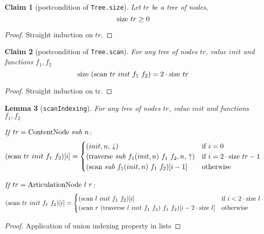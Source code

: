 \documentclass{article}
\newtheorem{lemma}{Lemma}
\newtheorem{claim}[lemma]{Claim}
\newcommand{\textfun}[1]{\textup{#1}}
\newcommand{\textcode}[1]{\texttt{#1}}
\newcommand{\fone}[2]{\ensuremath{f_{1}(#1, #2)}}
\newcommand{\contentNode}[2]{\textfun{ContentNode}\ #1\ #2}
\newcommand{\artNode}[2]{\textfun{ArticulationNode}\ #1\ #2}
\newcommand{\longtraverse}[4]{\textfun{traverse}\ #1\ #2\ #3 \ #4}
\newcommand{\longscan}[4]{\textfun{scan}\ #1\ #2\ #3 \ #4}
\newcommand{\up}{\uparrow}
\newcommand{\down}{\downarrow}
\newcommand{\size}[1]{\textfun{size}\ #1}
\begin{document}
\begin{claim}[postcondition of \textcode{Tree.size}]
    \label{size_pos}
    Let $tr$ be a tree of nodes, 
    \[\size{tr} \geq 0 \] 
\end{claim}
\begin{proof}
    Straight induction on $tr$.
\end{proof}

\begin{claim}[postcondition of \textcode{Tree.scan}]
    \label{scan_size}
    For any tree of nodes $tr$, value $init$ and functions $f_1, f_2$
    \[\size{(\longscan{tr}{init}{f_1}{f_2})} = 2 \cdot \size{tr}\]
\end{claim}

\begin{proof}
    Straight induction on tr.
\end{proof}

\begin{lemma}[\textcode{scanIndexing}]
    \label{scan_indexing}
    For any tree of nodes $tr$, value $init$ and functions $f_1, f_2$

    If $tr = \contentNode{sub}{n}$:
     \[(\longscan{tr}{init}{f_1}{f_2})[i] = 
        \begin{cases}
            (init, n,\,\down) & \text{if $i = 0$}\\
            (\longtraverse{sub}{\fone{init}{n}}{f_1}{f_2}, n,\,\up) & \text{if $i = 2 \cdot \size{tr} - 1$}\\
            (\longscan{sub}{\fone{init}{n}}{f_1}{f_2})[i - 1] & \text{otherwise}
        \end{cases}\]

    If $tr = \artNode{l}{r}$:
     \[(\longscan{tr}{init}{f_1}{f_2})[i] = 
        \begin{cases}
            (\longscan{l}{init}{f_1}{f_2})[i] & \text{if $i < 2\cdot \size{l}$}\\
            (\longscan{r}{(\longtraverse{l}{init}{f_1}{f_2})}{f_1}{f_2})[i - 2 \cdot \size{l}] & \text{otherwise}
        \end{cases}\]
        
\end{lemma}

\begin{proof}
    Application of union indexing property in lists
\end{proof}
\end{document}
